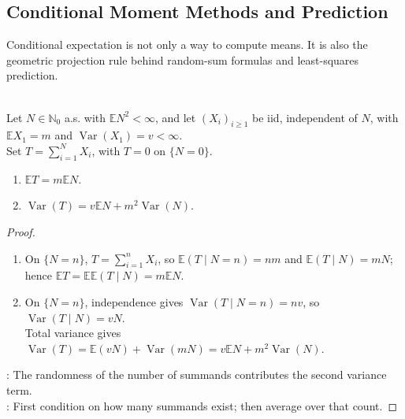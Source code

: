 \subsection{Conditional Moment Methods and Prediction}

Conditional expectation is not only a way to compute means.  It is also the geometric projection rule behind random-sum formulas and least-squares prediction.

\begin{proposition} \label{prop:random-sum-mean-and-variance} \\
Let $N\in\mathbb{N}_0$ a.s. with $\mathbb{E}N^2<\infty$, and let $(X_i)_{i\geq1}$ be iid, independent of $N$, with $\mathbb{E}X_1=m$ and $\operatorname{Var}(X_1)=v<\infty$.\\
Set $T=\sum\limits_{i=1}^{N}X_i$, with $T=0$ on $\{N=0\}$.
\begin{enumerate}[label=(\roman*)]
\setlength{\itemsep}{0pt}
\item $\mathbb{E}T=m\mathbb{E}N$.
\item $\operatorname{Var}(T)=v\mathbb{E}N+m^2\operatorname{Var}(N)$.
\end{enumerate}
\begin{proof}
\begin{enumerate}[label=(\roman*)]
\setlength{\itemsep}{0pt}
\item On $\{N=n\}$, $T=\sum\limits_{i=1}^{n}X_i$, so $\mathbb{E}(T\mid N=n)=nm$ and $\mathbb{E}(T\mid N)=mN$; hence $\mathbb{E}T=\mathbb{E}\mathbb{E}(T\mid N)=m\mathbb{E}N$.
\item On $\{N=n\}$, independence gives $\operatorname{Var}(T\mid N=n)=nv$, so $\operatorname{Var}(T\mid N)=vN$.\\
Total variance gives $\operatorname{Var}(T)=\mathbb{E}(vN)+\operatorname{Var}(mN)=v\mathbb{E}N+m^2\operatorname{Var}(N)$.
\end{enumerate}
: The randomness of the number of summands contributes the second variance term.\\
: First condition on how many summands exist; then average over that count.
\end{proof}
\end{proposition}

